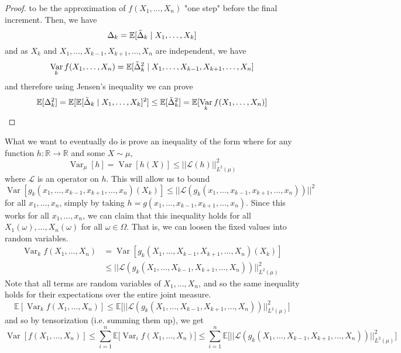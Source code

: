 \documentclass{article}
\DeclareMathOperator{\Var}{Var}
\begin{document}
\begin{proof}
to be the approximation of $f(X_1, \ldots, X_n)$ "one step" before the final increment. Then, we have 
\[\Delta_k = \mathbb{E}[\Tilde{\Delta}_k \mid X_1, \ldots, X_k]\]
and as $X_k$ and $X_1, \ldots, X_{k-1}, X_{k+1}, \ldots, X_n$ are independent, we have 
\[\Var_k f(X_1, \ldots, X_n) = \mathbb{E}[\Tilde{\Delta}_k^2 \mid X_1, \ldots, X_{k-1}, X_{k+1}, \ldots, X_n] \]
and therefore using Jensen's inequality we can prove 
\[\mathbb{E}[\Delta_k^2] = \mathbb{E}[\mathbb{E}[ \Tilde{\Delta}_k \mid X_1, \ldots, X_k]^2 ] \leq \mathbb{E}[\Tilde{\Delta}_k^2] = \mathbb{E}[\Var_k f(X_1, \ldots, X_n)]\]
\end{proof}

What we want to eventually do is prove an inequality of the form where for any function $h: \mathbb{R} \rightarrow \mathbb{R}$ and some $X \sim \mu$, 
\[\Var_\mu[h] = \Var [h(X)] \leq ||\mathcal{L}(h)||^2_{L^2 (\mu)}\]
where $\mathcal{L}$ is an operator on $h$. This will allow us to bound 
\[\Var [g_k (x_1, \ldots, x_{k-1}, x_{k+1}, \ldots, x_n)(X_k)] \leq ||\mathcal{L}(g_k (x_1, \ldots, x_{k-1}, x_{k+1}, \ldots, x_n))||^2\]
for all $x_1, \ldots, x_n$, simply by taking $h = g(x_1, \ldots, x_{k-1}, x_{k+1}, \ldots, x_n)$. Since this works for all $x_1, \ldots, x_n$, we can claim that this inequality holds for all $X_1 (\omega), \ldots, X_n (\omega)$ for all $\omega \in \Omega$. That is, we can loosen the fixed values into random variables. 
\begin{align*}
    \Var_{k} f(X_1, \ldots, X_n) & = \Var[g_k (X_1, \ldots, X_{k-1}, X_{k+1}, \ldots, X_n)(X_k)] \\
    & \leq || \mathcal{L}(g_k (X_1, \ldots, X_{k-1}, X_{k+1}, \ldots, X_n))||^2_{L^2 (\mu)} 
\end{align*}
Note that all terms are random variables of $X_1, \ldots, X_n$, and so the same inequality holds for their expectations over the entire joint measure. 
\[\mathbb{E}[ \Var_{k} f(X_1, \ldots, X_n) ] \leq \mathbb{E} \big[ || \mathcal{L}(g_k (X_1, \ldots, X_{k-1}, X_{k+1}, \ldots, X_n))||^2_{L^2 (\mu)} \big] \]
and so by tensorization (i.e. summing them up), we get 
\[\Var[f(X_1, \ldots, X_n)] \leq \sum_{i=1}^n \mathbb{E} \big[ \Var_i f(X_1, \ldots, X_n) \big] \leq \sum_{i=1}^n \mathbb{E} \big[ || \mathcal{L}(g_k (X_1, \ldots, X_{k-1}, X_{k+1}, \ldots, X_n))||^2_{L^2 (\mu)} \big] \]
\end{document}
